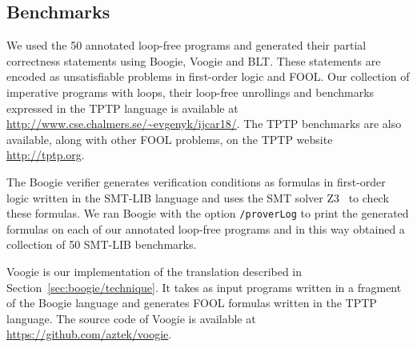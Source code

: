 \subsection{Benchmarks}\label{sec:boogie/experiments/problems}
We used the 50 annotated loop-free programs and generated their partial correctness statements using Boogie, Voogie and BLT. These statements are encoded as unsatisfiable problems in first-order logic and FOOL.
Our collection of imperative programs with loops, their loop-free unrollings and benchmarks expressed in the TPTP language \cite{TPTP} is available at \url{http://www.cse.chalmers.se/~evgenyk/ijcar18/}. The TPTP benchmarks are also available, along with other FOOL problems, on the TPTP website \url{http://tptp.org}.

The Boogie verifier generates verification conditions as formulas in first-order logic written in the SMT-LIB language and uses the SMT solver Z3~\cite{Z3} to check these formulas. We ran Boogie with the option \verb'/proverLog' to print the generated formulas on each of our annotated loop-free programs and in this way obtained a collection of 50 SMT-LIB benchmarks.

Voogie is our implementation of the translation described in Section~\ref{sec:boogie/technique}. It takes as input programs written in a fragment of the Boogie language and generates FOOL formulas written in the TPTP language. The source code of Voogie is available at \url{https://github.com/aztek/voogie}.

